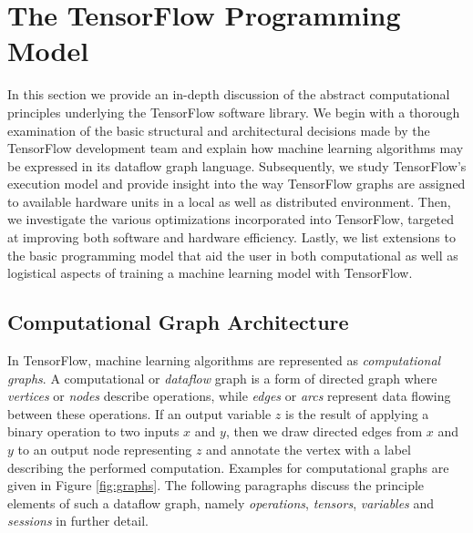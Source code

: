 \section{The TensorFlow Programming Model}\label{sec:model}

In this section we provide an in-depth discussion of the abstract computational
principles underlying the TensorFlow software library. We begin with a thorough
examination of the basic structural and architectural decisions made by the
TensorFlow development team and explain how machine learning algorithms may be
expressed in its dataflow graph language. Subsequently, we study TensorFlow's
execution model and provide insight into the way TensorFlow graphs are assigned
to available hardware units in a local as well as distributed environment. Then,
we investigate the various optimizations incorporated into TensorFlow, targeted
at improving both software and hardware efficiency. Lastly, we list extensions
to the basic programming model that aid the user in both computational as well
as logistical aspects of training a machine learning model with TensorFlow.

\subsection{Computational Graph Architecture}\label{sec:model-graphs}

In TensorFlow, machine learning algorithms are represented as
\emph{computational graphs}. A computational or \emph{dataflow} graph is a form
of directed graph where \emph{vertices} or \emph{nodes} describe operations,
while \emph{edges} or \emph{arcs} represent data flowing between these
operations. If an output variable $z$ is the result of applying a binary
operation to two inputs $x$ and $y$, then we draw directed edges from $x$ and
$y$ to an output node representing $z$ and annotate the vertex with a label
describing the performed computation. Examples for computational graphs are
given in Figure \ref{fig:graphs}. The following paragraphs discuss the principle
elements of such a dataflow graph, namely \emph{operations}, \emph{tensors},
\emph{variables} and \emph{sessions} in further detail.


